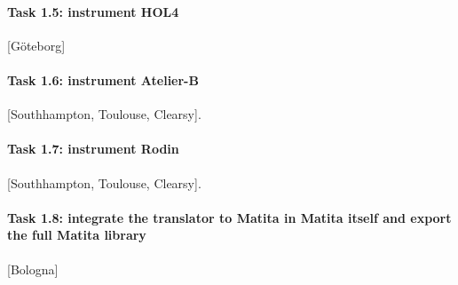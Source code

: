 

\paragraph{Task 1.5: instrument HOL4}

[G\"oteborg]

\paragraph{Task 1.6: instrument Atelier-B}

[Southhampton, Toulouse, Clearsy].

\paragraph{Task 1.7: instrument Rodin}

[Southhampton, Toulouse, Clearsy].

\paragraph{Task 1.8: integrate the translator to Matita in Matita itself and export the full Matita library}

[Bologna]


